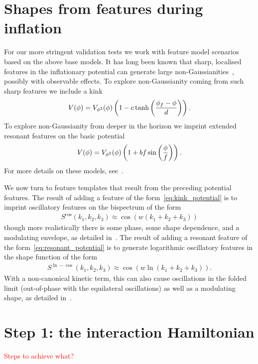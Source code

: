 \section{Shapes from features during inflation}
For our more stringent validation tests we work with feature model scenarios
based on the above base models.
It has long been known that sharp, localised features in the inflationary potential
can generate large non-Gaussianities~\cite{chen_easther_lim_1}, possibly with observable effects.
To explore non-Gaussianity coming from such sharp features we include
a kink~\cite{Adams_step}
\begin{align}\label{eq:kink_potential}
    V(\phi) = V_{\phi^2}(\phi)\left(1-c\tanh\left(\frac{\phi_f-\phi}{d}\right)\right).
\end{align}
To explore non-Gaussianity from deeper in the horizon we imprint
extended resonant features on the basic potential
\begin{align}\label{eq:resonant_potential}
    V(\phi) = V_{\phi^2}(\phi)\left(1+bf\sin\left(\frac{\phi}{f}\right)\right).
\end{align}
For more details on these models, see~\cite{chen_easther_lim_2}.


We now turn to feature templates that result from the preceding potential features.
The result of adding a feature of the form~\eqref{eq:kink_potential}
is to imprint oscillatory features on the bispectrum of the form
\begin{align}\label{cos_shape}
    S^{\cos}(k_1,k_2,k_3) \approx \cos(w(k_1+k_2+k_3))
\end{align}
though more realistically there is some phase, some shape dependence, and a modulating envelope,
as detailed in~\cite{adshead}.
The result of adding a resonant feature of the form~\eqref{eq:resonant_potential}
is to generate logarithmic oscillatory features in the shape function of the form
\begin{align}\label{ln_cos_shape}
    S^{\ln-\cos}(k_1,k_2,k_3) \approx \cos(w\ln(k_1+k_2+k_3)).
\end{align}
With a non-canonical kinetic term, this can also
cause oscillations in the folded limit (out-of-phase
with the equilateral oscillations) as well as a modulating shape,
as detailed in~\cite{chen_folded_resonant}.


    \section{Step 1: the interaction Hamiltonian}
    \textcolor{red}{Steps to achieve what?}
